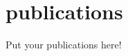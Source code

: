 \documentclass[]{friggeri-cv}
\begin{document}
\section{publications}

Put your publications here!

%
\end{document}
